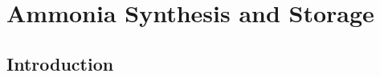 




\newcommand\tc{400}
\newcommand\pbar{150}
\newcommand\ammOUT{227.6}  %
\newcommand\conv{34}	%
\newcommand\purge{5}


%


\section{Ammonia Synthesis and Storage}
\label{sec:JRsynthandstorage}
\subsection{Introduction}
{\renewcommand{\arraystretch}{1.0}}

